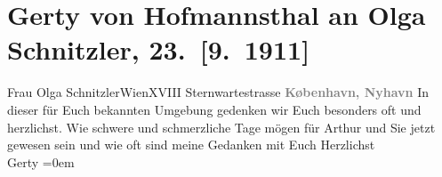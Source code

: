 

         
         \renewcommand{\erwaehntePersonen}{Personen: Gertrude von Hofmannsthal, Olga Schnitzler}
         \renewcommand{\erwaehnteOrte}{Orte: Kopenhagen, Nyhavn, Sternwartestraße 71, Wien}
         \renewcommand{\erwaehnteWerke}{}
               \section[Gerty von Hofmannsthal an Olga Schnitzler, 23. {[}9. 1911{]}]{ Gerty von Hofmannsthal an Olga Schnitzler, 23. {[}9. 1911{]}}\nopagebreak{}\rehead{ }\begin{ledgroupsized}[t]{13cm}\normalsize\beginnumbering{} \toendnotes[C]{\smallbreak\pagebreak[2]} 
\pstart{}{\pb}Frau Olga
                  Schnitzler\pend{}\pstart{}Wien\pend{}\pstart{}XVIII Sternwartestrasse\pend{}{\bigskip}\pstart
           \noindent{}\centering{}\textcolor{gray}{\textbf{{\pb}København, Nyhavn}}\pend
           \pstart
           {\pb}In dieser für Euch bekannten
               Umgebung gedenken wir Euch besonders oft und herzlichst. Wie schwere und schmerzliche
               Tage mögen für Arthur und Sie jetzt gewesen
               sein {\pb}und wie oft sind meine
               Gedanken mit Euch\pend
           \pstart
           Herzlichst{\\[\baselineskip]}\spacefill\mbox{Gerty}\pend
           \leftskip=0em{}
         
         \endnumbering{}\end{ledgroupsized}  \newcommand{\dateiname}{L02031}\newcommand{\titel}{Gerty von Hofmannsthal an Olga Schnitzler, 23. [9. 1911]}\newcommand{\editorInnen}{Martin Anton Müller und Gerd-Hermann Susen}
      